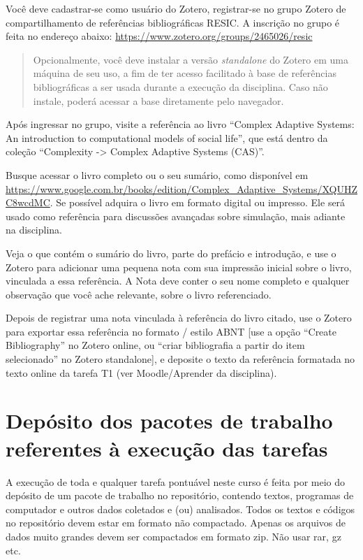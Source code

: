 Você deve cadastrar-se como usuário do Zotero, registrar-se no grupo Zotero de compartilhamento de referências bibliográficas RESIC.
A inscrição no grupo é feita no endereço abaixo:
\url{https://www.zotero.org/groups/2465026/resic}

\begin{quote}
Opcionalmente, você deve instalar a versão \textit{standalone} do Zotero em uma máquina de seu uso, a fim de ter acesso facilitado à base de referências bibliográficas a ser usada durante a execução da disciplina. Caso não instale, poderá acessar a base diretamente pelo navegador.
\end{quote}

Após ingressar no grupo, visite a referência ao livro ``Complex Adaptive Systems: An introduction to computational models of social life'', que está dentro da coleção ``Complexity -> Complex Adaptive Systems (CAS)''.

Busque acessar o livro completo ou o seu sumário, como disponível em \url{https://www.google.com.br/books/edition/Complex_Adaptive_Systems/XQUHZC8wcdMC}. Se possível adquira o livro em formato digital ou impresso. Ele será usado como referência para discussões avançadas sobre simulação, mais adiante na disciplina.

Veja o que contém o sumário do livro, parte do prefácio e introdução, e use o Zotero para adicionar uma pequena nota com sua impressão inicial sobre o livro, vinculada a essa referência. A Nota deve conter o seu nome completo e qualquer observação que você ache relevante, sobre o livro referenciado.

Depois de registrar uma nota vinculada à referência do livro citado, use o Zotero para exportar essa referência no formato / estilo ABNT [use a opção ``Create Bibliography'' no Zotero online, ou ``criar bibliografia a partir do item selecionado''  no Zotero standalone], e deposite o texto da referência formatada no texto online da tarefa T1 (ver Moodle/Aprender da disciplina).

\section{Depósito dos pacotes de trabalho referentes à execução das tarefas}

A execução de toda e qualquer tarefa pontuável neste curso é feita por meio do depósito de um pacote de trabalho no repositório, contendo textos, programas de computador e outros dados coletados e (ou) analisados. Todos os textos e códigos no repositório devem estar em formato não compactado. Apenas os arquivos de dados muito grandes devem ser compactados em formato zip. Não usar rar, gz etc. 


